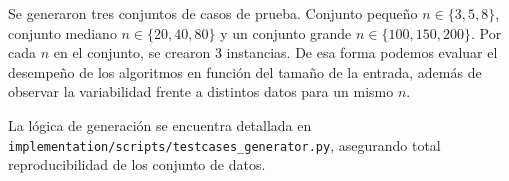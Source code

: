 Se generaron tres conjuntos de casos de prueba. Conjunto pequeño $n \in \{3, 5,8\}$, conjunto mediano $n \in \{20, 40, 80\}$ y un conjunto grande $n \in \{100, 150, 200\}$. Por cada $n$ en el conjunto, se crearon 3 instancias. De esa forma podemos evaluar el desempeño de los algoritmos en función del tamaño de la entrada, además de observar la variabilidad frente a distintos datos para un mismo $n$.

La lógica de generación se encuentra detallada en \texttt{implementation/scripts/testcases\_generator.py}, asegurando total reproducibilidad de los conjunto de datos.
